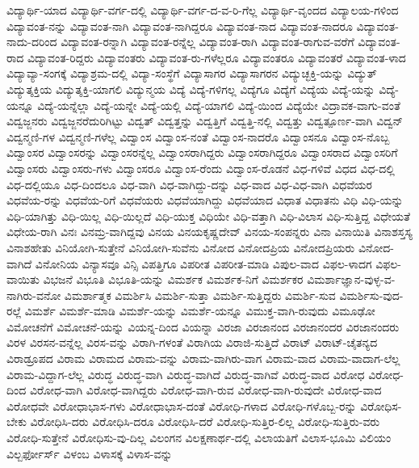 {ವಿದ್ಯಾರ್ಥಿ-ಯಾದ
ವಿದ್ಯಾರ್ಥಿ-ವರ್ಗ-ದಲ್ಲಿ
ವಿದ್ಯಾರ್ಥಿ-ವರ್ಗ-ದ-ವ-ರಿ-ಗೆಲ್ಲ
ವಿದ್ಯಾರ್ಥಿ-ವೃಂದದ
ವಿದ್ಯಾಲಯ-ಗಳಿಂದ
ವಿದ್ಯಾವಂತ-ನನ್ನು
ವಿದ್ಯಾವಂತ-ನಾಗಿ
ವಿದ್ಯಾವಂತ-ನಾಗಿದ್ದರೂ
ವಿದ್ಯಾವಂತ-ನಾದ
ವಿದ್ಯಾವಂತ-ನಾದರೂ
ವಿದ್ಯಾವಂತ-ನಾದು-ದರಿಂದ
ವಿದ್ಯಾವಂತ-ರನ್ನಾಗಿ
ವಿದ್ಯಾವಂತ-ರನ್ನೆಲ್ಲ
ವಿದ್ಯಾವಂತ-ರಾಗಿ
ವಿದ್ಯಾವಂತ-ರಾಗುವ-ವರೆಗೆ
ವಿದ್ಯಾವಂತ-ರಾದ
ವಿದ್ಯಾವಂತ-ರಿದ್ದರು
ವಿದ್ಯಾವಂತರು
ವಿದ್ಯಾವಂತ-ರು-ಗಳೆಲ್ಲರೂ
ವಿದ್ಯಾವಂತರೂ
ವಿದ್ಯಾವಂತರೆ
ವಿದ್ಯಾವಂತ-ಳಾದ
ವಿದ್ಯಾವ್ಯಾ-ಸಂಗಕ್ಕೆ
ವಿದ್ಯಾಶ್ರಮ-ದಲ್ಲಿ
ವಿದ್ಯಾ-ಸಂಸ್ಥೆಗೆ
ವಿದ್ಯಾಸಾಗರ
ವಿದ್ಯಾಸಾಗರನ
ವಿದ್ಯುಚ್ಛಕ್ತಿ-ಯನ್ನು
ವಿದ್ಯುತ್
ವಿದ್ಯುತ್ಶಕ್ತಿಯ
ವಿದ್ಯುತ್ಶಕ್ತಿ-ಯಾಗಲಿ
ವಿದ್ಯುನ್ಮಯ
ವಿದ್ಯೆ
ವಿದ್ಯೆ-ಗಳಿಗಲ್ಲ
ವಿದ್ಯೆಗೂ
ವಿದ್ಯೆಗೆ
ವಿದ್ಯೆಯ
ವಿದ್ಯೆ-ಯನ್ನು
ವಿದ್ಯೆ-ಯನ್ನೂ
ವಿದ್ಯೆ-ಯನ್ನೆಲ್ಲಾ
ವಿದ್ಯೆ-ಯನ್ನೇ
ವಿದ್ಯೆ-ಯಲ್ಲಿ
ವಿದ್ಯೆ-ಯಾಗಲಿ
ವಿದ್ಯೆ-ಯಿಂದ
ವಿದ್ಯೆಯೇ
ವಿದ್ರಾವಕ-ವಾಗು-ವಂತೆ
ವಿದ್ವಜ್ಜನರು
ವಿದ್ವಜ್ಜನರೆದುರಿಗಿಟ್ಟು
ವಿದ್ವತ್
ವಿದ್ವತ್ತನ್ನು
ವಿದ್ವತ್ತಿಗೆ
ವಿದ್ವತ್ತಿ-ನಲ್ಲಿ
ವಿದ್ವತ್ತು
ವಿದ್ವತ್ಪೂರ್ಣ-ವಾಗಿ
ವಿದ್ವನ್
ವಿದ್ವನ್ಮಣಿ-ಗಳ
ವಿದ್ವನ್ಮಣಿ-ಗಳೆಲ್ಲ
ವಿದ್ವಾಂಸ
ವಿದ್ವಾಂಸ-ನಂತೆ
ವಿದ್ವಾಂಸ-ನಾದರೊ
ವಿದ್ವಾಂಸನೂ
ವಿದ್ವಾಂಸ-ನೊಬ್ಬ
ವಿದ್ವಾಂಸರ
ವಿದ್ವಾಂಸರನ್ನು
ವಿದ್ವಾಂಸರನ್ನೆಲ್ಲ
ವಿದ್ವಾಂಸರಾಗಿದ್ದರು
ವಿದ್ವಾಂಸರಾಗಿದ್ದರೂ
ವಿದ್ವಾಂಸರಾದ
ವಿದ್ವಾಂಸರಿಗೆ
ವಿದ್ವಾಂಸರು
ವಿದ್ವಾಂಸರು-ಗಳು
ವಿದ್ವಾಂಸರೂ
ವಿದ್ವಾಂಸ-ರೆಂದು
ವಿದ್ವಾಂಸ-ರೊಡನೆ
ವಿಧ-ಗಳಿವೆ
ವಿಧದ
ವಿಧ-ದಲ್ಲಿ
ವಿಧ-ದಲ್ಲಿಯೂ
ವಿಧ-ದಿಂದಲೂ
ವಿಧ-ವಾಗಿ
ವಿಧ-ವಾಗಿದ್ದು-ದನ್ನು
ವಿಧ-ವಾದ
ವಿಧ-ವಿಧ-ವಾಗಿ
ವಿಧವೆಯರ
ವಿಧವೆಯ-ರನ್ನು
ವಿಧವೆಯ-ರಿಗೆ
ವಿಧವೆಯರು
ವಿಧವೆಯಾಗಿದ್ದು
ವಿಧವೆಯಾದ
ವಿಧಾತ
ವಿಧಾತನು
ವಿಧಿ
ವಿಧಿ-ಯನ್ನು
ವಿಧಿ-ಯಾಗಿತ್ತು
ವಿಧಿ-ಯಿಲ್ಲ
ವಿಧಿ-ಯಿಲ್ಲದೆ
ವಿಧಿ-ಯುಕ್ತ
ವಿಧಿಯೇ
ವಿಧಿ-ವತ್ತಾಗಿ
ವಿಧಿ-ವಿಲಾಸ
ವಿಧಿ-ಸುತ್ತಿದ್ದ
ವಿಧೇಯತೆ
ವಿಧೇಯ-ರಾಗಿ
ವಿನಃ
ವಿನಮ್ರ-ವಾಗಿದ್ದವು
ವಿನಯ
ವಿನಯಕೃಷ್ಣದೇವ್
ವಿನಯ-ಸಂಪನ್ನರು
ವಿನಾ
ವಿನಾಯಿತಿ
ವಿನಾಶಸ್ತಸ್ಯ
ವಿನಾಶಹೇತು
ವಿನಿಯೋಗಿ-ಸುತ್ತೇನೆ
ವಿನಿಯೋಗಿ-ಸುವೆನು
ವಿನೋದ
ವಿನೋದಪ್ರಿಯ
ವಿನೋದಪ್ರಿಯರು
ವಿನೋದ-ವಾಗಿದೆ
ವಿನೋನಿಯ
ವಿನ್ಯಾಸವೂ
ವಿನ್ಸಿ
ವಿಪತ್ತಿಗೂ
ವಿಪರೀತ
ವಿಪರೀತ-ಮಾಡಿ
ವಿಪುಲ-ವಾದ
ವಿಫಲ-ಳಾದಗ
ವಿಫಲ-ವಾಯಿತು
ವಿಭಜನೆ
ವಿಭೂತಿ
ವಿಭೂತಿ-ಯನ್ನು
ವಿಮರ್ಶಕ
ವಿಮರ್ಶಕ-ನಿಗೆ
ವಿಮರ್ಶಕರ
ವಿಮರ್ಶಾಜ್ಞಾನ-ವುಳ್ಳ-ವ-ನಾಗಿರು-ವನೋ
ವಿಮರ್ಶಾತ್ಮಕ
ವಿಮರ್ಶಿಸಿ
ವಿಮರ್ಶಿ-ಸುತ್ತಾ
ವಿಮರ್ಶಿ-ಸುತ್ತಿದ್ದರು
ವಿಮರ್ಶಿ-ಸುವ
ವಿಮರ್ಶಿಸು-ವುದ-ರಲ್ಲೆ
ವಿಮರ್ಶೆ
ವಿಮರ್ಶೆ-ಮಾಡಿ
ವಿಮರ್ಶೆ-ಯನ್ನು
ವಿಮರ್ಶೆ-ಯನ್ನೂ
ವಿಮುಕ್ತ-ವಾಗಿ-ರುವುದು
ವಿಮೂಢೋ
ವಿಮೋಚನೆಗೆ
ವಿಮೋಚನೆ-ಯನ್ನು
ವಿಯನ್ನ-ದಿಂದ
ವಿಯನ್ನಾ
ವಿರಜಾ
ವಿರಜಾನಂದ
ವಿರಜಾನಂದರ
ವಿರಜಾನಂದರು
ವಿರಳ
ವಿರಸನ-ವನ್ನೆಲ್ಲ
ವಿರಸ-ವನ್ನು
ವಿರಾಗಿ-ಗಳಂತೆ
ವಿರಾಗಿಯ
ವಿರಾಜಿ-ಸುತ್ತಿದೆ
ವಿರಾಟ್
ವಿರಾಟ್-ಚೈತನ್ಯದ
ವಿರಾಡ್ರೂಪದ
ವಿರಾಮ
ವಿರಾಮದ
ವಿರಾಮ-ವನ್ನು
ವಿರಾಮ-ವಾಗಿರು-ವಾಗ
ವಿರಾಮ-ವಾದ
ವಿರಾಮ-ವಾದಾಗ-ಲೆಲ್ಲ
ವಿರಾಮ-ವಿದ್ದಾಗ-ಲೆಲ್ಲ
ವಿರುದ್ಧ
ವಿರುದ್ಧ-ವಾಗಿ
ವಿರುದ್ಧ-ವಾಗಿದೆ
ವಿರುದ್ಧ-ವಾಗಿವೆ
ವಿರುದ್ಧ-ವಾದ
ವಿರೋಧ
ವಿರೋಧ-ದಿಂದ
ವಿರೋಧ-ವಾಗಿ
ವಿರೋಧ-ವಾಗಿದ್ದರು
ವಿರೋಧ-ವಾಗಿ-ರುವ
ವಿರೋಧ-ವಾಗಿ-ರುವುದೇ
ವಿರೋಧ-ವಾದ
ವಿರೋಧವೇ
ವಿರೋಧಾಭಾಸ-ಗಳು
ವಿರೋಧಾಭಾಸ-ದಂತೆ
ವಿರೋಧಿ-ಗಳಾದ
ವಿರೋಧಿ-ಗಳೊಬ್ಬ-ರನ್ನು
ವಿರೋಧಿಸ-ಬೇಕು
ವಿರೋಧಿಸಿ-ದರು
ವಿರೋಧಿಸಿ-ದರೂ
ವಿರೋಧಿಸಿ-ದರೆ
ವಿರೋಧಿ-ಸುತ್ತಿರ-ಲಿಲ್ಲ
ವಿರೋಧಿ-ಸುತ್ತಿರು-ವರು
ವಿರೋಧಿ-ಸುತ್ತೇನೆ
ವಿರೋಧಿಸು-ವು-ದಿಲ್ಲ
ವಿಲಂಗನ
ವಿಲಕ್ಷಣಾರ್ಥ-ದಲ್ಲಿ
ವಿಲಾಯತಿಗೆ
ವಿಲಾಸ-ಭೂಮಿ
ವಿಲಿಯಂ
ವಿಲ್ಬರ್ಫೋರ್ಸ್
ವಿಳಂಬ
ವಿಳಾಸಕ್ಕೆ
ವಿಳಾಸ-ವನ್ನು
}
